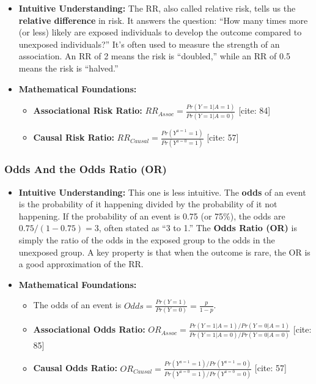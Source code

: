 \documentclass[
  10pt,
  letterpaper,
  DIV=11,
  numbers=noendperiod]{scrartcl}
\providecommand{\tightlist}{%
  \setlength{\itemsep}{0pt}\setlength{\parskip}{0pt}}
\begin{document}
\begin{itemize}
\tightlist
\item
  \textbf{Intuitive Understanding:} The RR, also called relative risk,
  tells us the \textbf{relative difference} in risk. It answers the
  question: ``How many times more (or less) likely are exposed
  individuals to develop the outcome compared to unexposed
  individuals?'' It's often used to measure the strength of an
  association. An RR of 2 means the risk is ``doubled,'' while an RR of
  0.5 means the risk is ``halved.''
\item
  \textbf{Mathematical Foundations:}

  \begin{itemize}
  \tightlist
  \item
    \textbf{Associational Risk Ratio:}
    \(RR_{Assoc} = \frac{Pr(Y=1|A=1)}{Pr(Y=1|A=0)}\) {[}cite: 84{]}
  \item
    \textbf{Causal Risk Ratio:}
    \(RR_{Causal} = \frac{Pr(Y^{a=1}=1)}{Pr(Y^{a=0}=1)}\) {[}cite: 57{]}
  \end{itemize}
\end{itemize}

\subsubsection{Odds And the Odds Ratio
(OR)}\label{odds-and-the-odds-ratio-or}

\begin{itemize}
\tightlist
\item
  \textbf{Intuitive Understanding:} This one is less intuitive. The
  \textbf{odds} of an event is the probability of it happening divided
  by the probability of it not happening. If the probability of an event
  is 0.75 (or 75\%), the odds are \(0.75 / (1-0.75) = 3\), often stated
  as ``3 to 1.'' The \textbf{Odds Ratio (OR)} is simply the ratio of the
  odds in the exposed group to the odds in the unexposed group. A key
  property is that when the outcome is rare, the OR is a good
  approximation of the RR.
\item
  \textbf{Mathematical Foundations:}

  \begin{itemize}
  \tightlist
  \item
    The odds of an event is
    \(Odds = \frac{Pr(Y=1)}{Pr(Y=0)} = \frac{p}{1-p}\).
  \item
    \textbf{Associational Odds Ratio:}
    \(OR_{Assoc} = \frac{Pr(Y=1|A=1) / Pr(Y=0|A=1)}{Pr(Y=1|A=0) / Pr(Y=0|A=0)}\)
    {[}cite: 85{]}
  \item
    \textbf{Causal Odds Ratio:}
    \(OR_{Causal} = \frac{Pr(Y^{a=1}=1) / Pr(Y^{a=1}=0)}{Pr(Y^{a=0}=1) / Pr(Y^{a=0}=0)}\)
    {[}cite: 57{]}
  \end{itemize}
\end{itemize}
\end{document}
